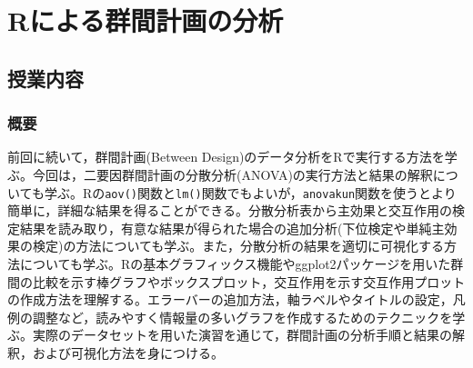 \section{Rによる群間計画の分析}
\label{b20_BetweenDesign_onR}

\subsection{授業内容}
\subsubsection{概要}
前回に続いて，群間計画(Between Design)のデータ分析をRで実行する方法を学ぶ。今回は，二要因群間計画の分散分析(ANOVA)の実行方法と結果の解釈についても学ぶ。Rの\verb|aov()|関数と\verb|lm()|関数でもよいが，\verb|anovakun|関数を使うとより簡単に，詳細な結果を得ることができる。分散分析表から主効果と交互作用の検定結果を読み取り，有意な結果が得られた場合の追加分析(下位検定や単純主効果の検定)の方法についても学ぶ。また，分散分析の結果を適切に可視化する方法についても学ぶ。Rの基本グラフィックス機能やggplot2パッケージを用いた群間の比較を示す棒グラフやボックスプロット，交互作用を示す交互作用プロットの作成方法を理解する。エラーバーの追加方法，軸ラベルやタイトルの設定，凡例の調整など，読みやすく情報量の多いグラフを作成するためのテクニックを学ぶ。実際のデータセットを用いた演習を通じて，群間計画の分析手順と結果の解釈，および可視化方法を身につける。


